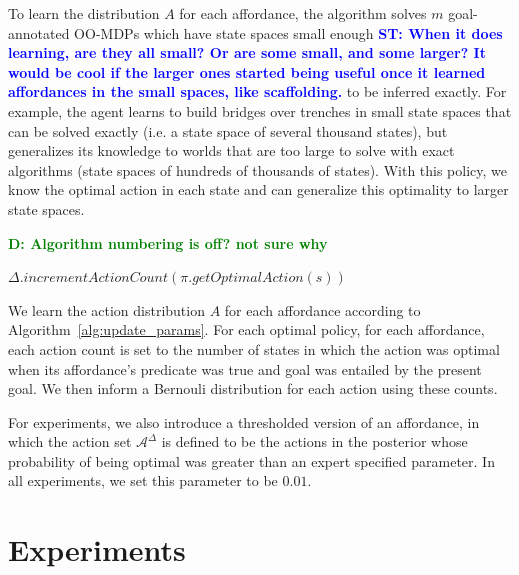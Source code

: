 \documentclass[conference]{IEEEtran}
\newcommand{\stnote}[1]{\textcolor{Blue}{\textbf{ST: #1}}}
\newcommand{\dnote}[1]{\textcolor{Green}{\textbf{D: #1}}}
\begin{document}
To learn the distribution $A$ for each affordance, the algorithm
solves $m$ goal-annotated OO-MDPs which have state spaces small enough
\stnote{When it does learning, are they all small?  Or are some small,
  and some larger?  It would be cool if the larger ones started being
  useful once it learned affordances in the small spaces, like
  scaffolding.}  to be inferred exactly.  For example, the agent
learns to build bridges over trenches in small state spaces that can
be solved exactly (i.e. a state space of several thousand states), but
generalizes its knowledge to worlds that are too large to solve with
exact algorithms (state spaces of hundreds of thousands of
states). With this policy, we know the optimal action in each state
and can generalize this optimality to larger state spaces.

\dnote{Algorithm numbering is off? not sure why}
\begin{algorithm}
  \caption{$updateParameters(knowledgeBase, \pi)$}
  \begin{algorithmic}[1]
    \State $\Delta.incrementActionCount(\pi.getOptimalAction(s))$
    \EndIf
    \EndFor
    \EndFor
  \end{algorithmic}
  \label{alg:update_params}
  \caption{\dnote{Do we need this anymore? If we're just counting and forming bernoulis?}}
\end{algorithm}

We learn the action distribution $A$ for each affordance according to Algorithm~\ref{alg:update_params}.
For each optimal policy, for each affordance, each action count is set to the number of states
in which the action was optimal when its affordance's predicate was true and goal was
entailed by the present goal. We then inform a Bernouli distribution for each action 
using these counts.

For experiments, we also introduce a thresholded version of an affordance, in which
the action set $\mathcal{A}^\Delta$ is defined to be the actions in the posterior
whose probability of being optimal was greater than an expert specified parameter. In
all experiments, we set this parameter to be $0.01$.

\section{Experiments}
\label{sec:experiments}
\end{document}

